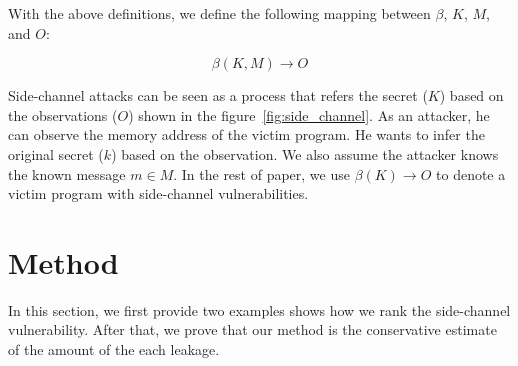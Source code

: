 With the above definitions, we define the following mapping between $\beta$,
$K$, $M$, and $O$:

\begin{displaymath}
  \beta(K, M) \rightarrow O
\end{displaymath}


Side-channel attacks can be seen as a process that refers the secret ($K$) based on the observations ($O$) shown in the figure~\ref{fig:side_channel}. As an attacker, he can observe the memory address of the victim program. He wants to infer the original secret ($k$) based on the observation. We also assume the attacker knows the known message $m \in M$. In the rest of paper, we use $\beta(K) \rightarrow O$ to denote a victim program with side-channel vulnerabilities.

\section{Method}
In this section, we first provide two examples shows how we rank the side-channel vulnerability. After that, we prove that our method is the conservative estimate of the amount of the each leakage.


